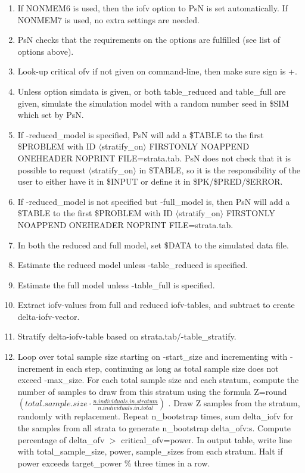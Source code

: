 \begin{enumerate}
\item If NONMEM6 is used, then the iofv option to PsN is set automatically. If NONMEM7 is used, no extra settings are needed.
\item PsN checks that the requirements on the options are fulfilled (see list of options above).
\item Look-up critical ofv if not given on command-line, then make sure sign is +.
\item Unless option simdata is given, or both table\_reduced and table\_full are given, simulate the simulation model with a random number seed in \$SIM which set by PsN.
\item If -reduced\_model is specified, PsN will add a \$TABLE to the first \$PROBLEM with ID $\langle$stratify\_on$\rangle$ FIRSTONLY NOAPPEND ONEHEADER NOPRINT FILE=strata.tab. PsN does not check that it is possible to request $\langle$stratify\_on$\rangle$ in \$TABLE, so it is the responsibility of the user to either have it in \$INPUT or define it in \$PK/\$PRED/\$ERROR.
\item If -reduced\_model is not specified but -full\_model is, then  PsN will add a \$TABLE to the first \$PROBLEM with ID $\langle$stratify\_on$\rangle$ FIRSTONLY NOAPPEND ONEHEADER NOPRINT FILE=strata.tab.
\item In both the reduced and full model, set \$DATA to the simulated data file.
\item Estimate the reduced model unless -table\_reduced is specified.
\item Estimate the full model unless -table\_full is specified.
\item Extract iofv-values from full and reduced iofv-tables, and subtract to create delta-iofv-vector.
\item Stratify delta-iofv-table based on strata.tab/-table\_stratify.
\item Loop over total sample size starting on -start\_size and incrementing with -increment in each step, continuing as long as total sample size does not exceed -max\_size. For each total sample size and each stratum, compute the number of samples to draw from this stratum using the formula
Z=round\begin{math}
(total.sample.size\cdot\frac{n.individuals.in.stratum}{n.individuals.in.total})
\end{math}
. Draw Z samples from the stratum, randomly with replacement. Repeat n\_bootstrap times, sum delta\_iofv for the samples from all strata to generate n\_bootstrap delta\_ofv:s. Compute percentage of delta\_ofv $>$ critical\_ofv=power. In output table, write line with total\_sample\_size, power, sample\_sizes from each stratum. Halt if power exceeds target\_power \% three times in a row.
\end{enumerate}



